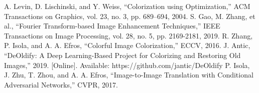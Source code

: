 \documentclass[conference]{IEEEtran}
\begin{document}
\begin{thebibliography}{99}
 A. Levin, D. Lischinski, and Y. Weiss, “Colorization using Optimization,” ACM Transactions on Graphics, vol. 23, no. 3, pp. 689–694, 2004.
 S. Gao, M. Zhang, et al., “Fourier Transform-based Image Enhancement Techniques,” IEEE Transactions on Image Processing, vol. 28, no. 5, pp. 2169-2181, 2019.
 R. Zhang, P. Isola, and A. A. Efros, “Colorful Image Colorization,” ECCV, 2016.
 J. Antic, “DeOldify: A Deep Learning-Based Project for Colorizing and Restoring Old Images,” 2019. [Online]. Available: https://github.com/jantic/DeOldify
 P. Isola, J. Zhu, T. Zhou, and A. A. Efros, “Image-to-Image Translation with Conditional Adversarial Networks,” CVPR, 2017.
\end{thebibliography}
\vspace{12pt}
\end{document}
